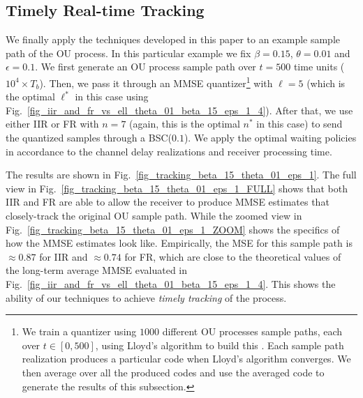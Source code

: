 \documentclass[12pt,journal,onecolumn]{IEEEtran}
\begin{document}
\subsection{Timely Real-time Tracking}

We finally apply the techniques developed in this paper to an example sample path of the OU process. In this particular example we fix $\beta=0.15$, $\theta=0.01$ and $\epsilon=0.1$. We first generate an OU process sample path over $t=500$ time units ($10^4\times T_b$). Then, we pass it through an MMSE quantizer\footnote{We train a quantizer using $1000$ different OU processes sample paths, each over $t\in[0,500]$, using Lloyd's algorithm to build this \cite{cover}. Each sample path realization produces a particular code when Lloyd's algorithm converges. We then average over all the produced codes and use the averaged code to generate the results of this subsection.} with $\ell=5$ (which is the optimal $\ell^*$ in this case using Fig.~\ref{fig_iir_and_fr_vs_ell_theta_01_beta_15_eps_1_4}). After that, we use either IIR or FR with $n=7$ (again, this is the optimal $n^*$ in this case) to send the quantized samples through a BSC($0.1$). We apply the optimal waiting policies in accordance to the channel delay realizations and receiver processing time.

The results are shown in Fig.~\ref{fig_tracking_beta_15_theta_01_eps_1}. The full view in Fig.~\ref{fig_tracking_beta_15_theta_01_eps_1_FULL} shows that both IIR and FR are able to allow the receiver to produce MMSE estimates that closely-track the original OU sample path. While the zoomed view in Fig.~\ref{fig_tracking_beta_15_theta_01_eps_1_ZOOM} shows the specifics of how the MMSE estimates look like. Empirically, the MSE for this sample path is $\approx0.87$ for IIR and $\approx0.74$ for FR, which are close to the theoretical values of the long-term average MMSE evaluated in Fig.~\ref{fig_iir_and_fr_vs_ell_theta_01_beta_15_eps_1_4}. This shows the ability of our techniques to achieve {\it timely tracking} of the process.
\end{document}
